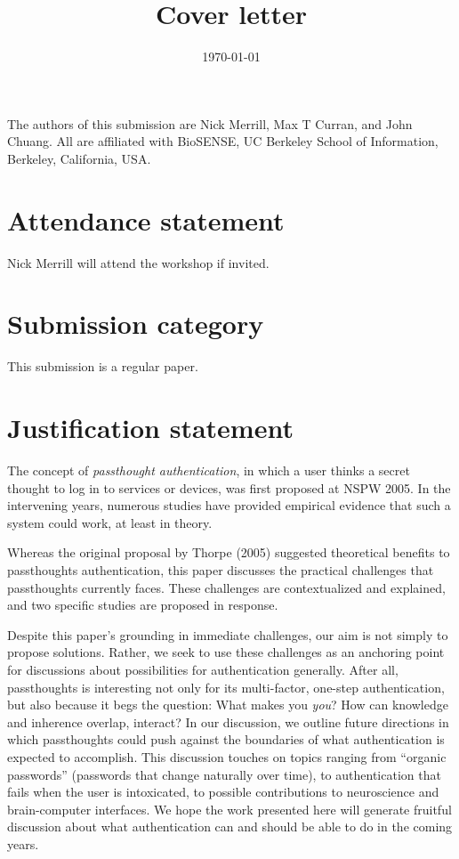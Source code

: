 \documentclass[11pt]{article}
\date{\today}
\title{Cover letter}
\begin{document}
\maketitle
The authors of this submission are Nick Merrill, Max T Curran, and John Chuang. 
All are affiliated with BioSENSE, UC Berkeley School of Information, Berkeley, California, USA.

\section{Attendance statement}
\label{sec:org59fbeb0}

Nick Merrill will attend the workshop if invited.

\section{Submission category}
\label{sec:org65a5840}

This submission is a regular paper.

\section{Justification statement}
\label{sec:orge7c7e19}
The concept of \emph{passthought authentication}, in which a user thinks a secret thought to log in to services or devices, was first proposed at NSPW 2005.
In the intervening years, numerous studies have provided empirical evidence that such a system could work, at least in theory.

Whereas the original proposal by Thorpe (2005) suggested theoretical benefits to passthoughts authentication,
this paper discusses the practical challenges that passthoughts currently faces.
These challenges are contextualized and explained, and two specific studies are proposed in response.


Despite this paper's grounding in immediate challenges,
our aim is not simply to propose solutions.
Rather, we seek to use these challenges as an anchoring point for discussions about possibilities for authentication generally.
After all, passthoughts is interesting not only for its multi-factor, one-step authentication, but also because it begs the question: What makes you \emph{you}?
How can knowledge and inherence overlap, interact?
In our discussion, we outline future directions in which passthoughts could push against the boundaries of what authentication is expected to accomplish.
This discussion touches on topics ranging from ``organic passwords'' (passwords that change naturally over time),
to authentication that fails when the user is intoxicated,
to possible contributions to neuroscience and brain-computer interfaces.
We hope the work presented here will generate fruitful discussion about 
what authentication can and should be able to do in the coming years.
\end{document}

